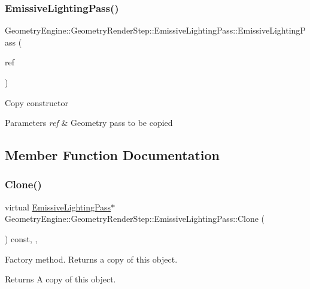\subsubsection{\texorpdfstring{EmissiveLightingPass()}{EmissiveLightingPass()}}
{\footnotesize\ttfamily Geometry\+Engine\+::\+Geometry\+Render\+Step\+::\+Emissive\+Lighting\+Pass\+::\+Emissive\+Lighting\+Pass (\begin{DoxyParamCaption}\item[{const \mbox{\hyperlink{class_geometry_engine_1_1_geometry_render_step_1_1_emissive_lighting_pass}{Emissive\+Lighting\+Pass}} \&}]{ref }\end{DoxyParamCaption})\hspace{0.3cm}{\ttfamily [inline]}}

Copy constructor 
\begin{DoxyParams}{Parameters}
{\em ref} & Geometry pass to be copied \\
\hline
\end{DoxyParams}


\subsection{Member Function Documentation}
\mbox{\label{class_geometry_engine_1_1_geometry_render_step_1_1_emissive_lighting_pass_a5a46d5e73fe672e09584a2e6e8bfa5e8}} 
\subsubsection{\texorpdfstring{Clone()}{Clone()}}
{\footnotesize\ttfamily virtual \mbox{\hyperlink{class_geometry_engine_1_1_geometry_render_step_1_1_emissive_lighting_pass}{Emissive\+Lighting\+Pass}}$\ast$ Geometry\+Engine\+::\+Geometry\+Render\+Step\+::\+Emissive\+Lighting\+Pass\+::\+Clone (\begin{DoxyParamCaption}{ }\end{DoxyParamCaption}) const\hspace{0.3cm}{\ttfamily [inline]}, {\ttfamily [override]}, {\ttfamily [virtual]}}

Factory method. Returns a copy of this object. \begin{DoxyReturn}{Returns}
A copy of this object. 
\end{DoxyReturn}



